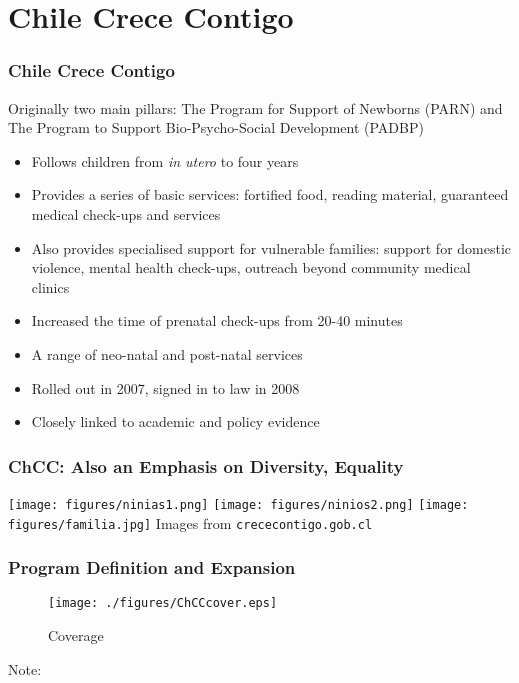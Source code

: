 \documentclass[10pt,letterpaper,subeqn]{beamer}
\begin{document}
\section{Chile Crece Contigo}
\begin{frame}
\frametitle{Chile Crece Contigo}
Originally two main pillars: The Program for Support of Newborns (PARN) and The Program to Support Bio-Psycho-Social Development (PADBP) \\ \vspace{3mm}
\begin{itemize}
\item Follows children from \emph{in utero} to four years
\item Provides a series of basic services: fortified food, reading material, guaranteed medical check-ups and services
\item Also provides specialised support for vulnerable families: support for domestic violence, mental health check-ups, outreach beyond community medical clinics
\item Increased the time of prenatal check-ups from 20-40 minutes
\item A range of neo-natal and post-natal services
\item Rolled out in 2007, signed in to law in 2008
\item Closely linked to academic and policy evidence 
\end{itemize}
\end{frame}

\begin{frame}
  \frametitle{ChCC: Also an Emphasis on Diversity, Equality}
\hfil\hfil\texttt{[image: figures/ninias1.png]}\hfil\hfil
\texttt{[image: figures/ninios2.png]}\newline
\null\hfil\hfil\makebox[5cm]{}
\hfil\hfil\makebox[5cm]{}
\vfil
\hfil\hfil\texttt{[image: figures/familia.jpg]}\newline
\null\hfil\hfil\makebox[5cm]{}\newline
{\footnotesize Images from \texttt{crececontigo.gob.cl}}
\end{frame}

\begin{frame}
\frametitle{Program Definition and Expansion}
\begin{figure}[htpb!]
  \begin{center}
  \centering
  \caption{Coverage}
  \texttt{[image: ./figures/ChCCcover.eps]}
  \label{fig:ChCCcover}
\end{center}
\end{figure}
\vspace{-5mm}
\footnotesize{Note: }
\end{frame}
\end{document}
